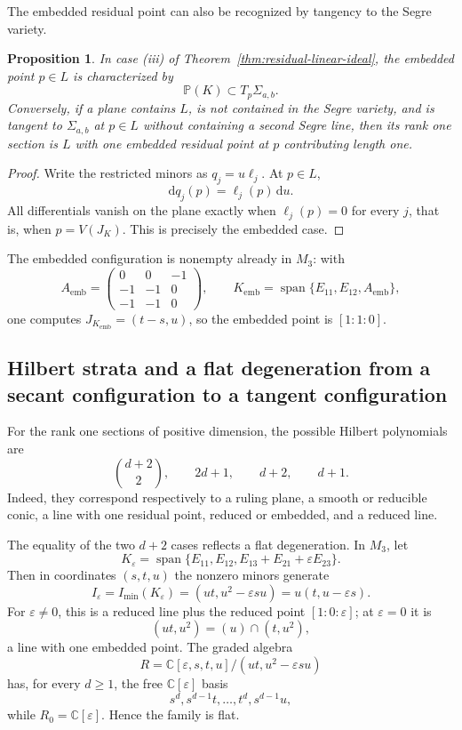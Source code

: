 \documentclass[11pt]{amsart}
\newcommand{\chg}[1]{#1}
\newcommand{\Span}{\operatorname{span}}
\newcommand{\dd}{\mathrm d}
\theoremstyle{plain}
\newtheorem{proposition}[theorem]{Proposition}
\theoremstyle{definition}
\theoremstyle{remark}
\begin{document}
\chg{The embedded residual point can also be recognized by tangency to the Segre variety.}

\begin{proposition}\label{prop:tangency}
In case (iii) of Theorem~\ref{thm:residual-linear-ideal}, the embedded point $p\in L$ is characterized by
\[
\mathbb P(K)\subset T_p\Sigma_{a,b}.
\]
Conversely, if a plane contains $L$, is not contained in the Segre variety, and is tangent to $\Sigma_{a,b}$ at $p\in L$ without containing a second Segre line, then its \chg{rank one} section is $L$ with {one embedded residual point at $p$ contributing length one}.
\end{proposition}

\begin{proof}
Write the restricted minors as $q_j=u\ell_j$. At $p\in L$,
\[
\dd q_j(p)=\ell_j(p)\,\dd u.
\]
All differentials vanish on the plane exactly when $\ell_j(p)=0$ for every $j$, that is, when $p=V(J_K)$. This is precisely the embedded case.
\end{proof}

The embedded configuration is nonempty already in $M_3$: with
\[
A_{\mathrm{emb}}=
\begin{pmatrix}
0&0&-1\\
-1&-1&0\\
-1&-1&0
\end{pmatrix},
\qquad
K_{\mathrm{emb}}=\Span\{E_{11},E_{12},A_{\mathrm{emb}}\},
\]
one computes $J_{K_{\mathrm{emb}}}=(t-s,u)$, so the embedded point is $[1:1:0]$.

\subsection{\chg{Hilbert strata and a flat degeneration from a secant configuration to a tangent configuration}}

For the \chg{rank one sections of positive dimension}, the possible Hilbert polynomials are
\[
\binom{d+2}{2},\qquad 2d+1,\qquad d+2,\qquad d+1.
\]
Indeed, they correspond respectively to a ruling plane, a smooth or reducible conic, a line with one residual point, reduced or embedded, and a reduced line.

The equality of the two $d+2$ cases reflects a flat degeneration. In $M_3$, let
\[
K_\varepsilon=\Span\{E_{11},E_{12},E_{13}+E_{21}+\varepsilon E_{23}\}.
\]
Then in coordinates $(s,t,u)$ the nonzero minors generate
\[
I_\varepsilon={I_{\min}(K_\varepsilon)}=(ut,u^2-\varepsilon su)=u(t,u-\varepsilon s).
\]
For $\varepsilon\ne0$, this is a reduced line plus the reduced point $[1:0:\varepsilon]$; at $\varepsilon=0$ it is
\[
(ut,u^2)=(u)\cap(t,u^2),
\]
a line with one embedded point. The graded algebra
\[
R=\mathbb C[\varepsilon,s,t,u]/(ut,u^2-\varepsilon su)
\]
has, for every $d\ge1$, the free $\mathbb C[\varepsilon]$ basis
\[
s^d,s^{d-1}t,\ldots,t^d,s^{d-1}u,
\]
while $R_0=\mathbb C[\varepsilon]$. Hence the family is flat.
\end{document}

